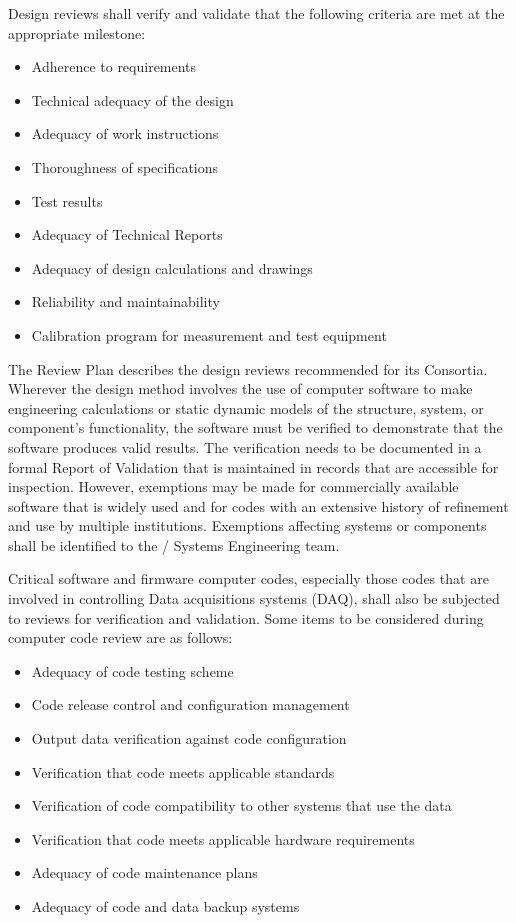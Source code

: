 Design reviews shall verify and validate that the following criteria
are met at the appropriate milestone:
\begin{itemize}
 \item Adherence to requirements
 \item Technical adequacy of the design
 \item Adequacy of work instructions
 \item Thoroughness of specifications
 \item Test results
 \item Adequacy of Technical Reports
 \item Adequacy of design calculations and drawings
 \item Reliability and maintainability
 \item Calibration program for measurement and test equipment
\end{itemize}

The  Review Plan describes the design reviews recommended for its
Consortia.  Wherever the design method involves the use of computer
software to make engineering calculations or static dynamic models of
the structure, system, or component's functionality, the software must
be verified to demonstrate that the software produces valid
results. The verification needs to be documented in a formal Report of
Validation that is maintained in records that are accessible for
inspection. However, exemptions may be made for commercially available
software that is widely used and for codes with an extensive history
of refinement and use by multiple institutions. Exemptions affecting
systems or components shall be identified to the / Systems
Engineering team.

Critical software and firmware computer codes, especially those codes
that are involved in controlling  Data acquisitions systems (DAQ),
shall also be subjected to reviews for verification and
validation. Some items to be considered during computer code review
are as follows:
\begin{itemize}
 \item Adequacy of code testing scheme
 \item Code release control and configuration management
 \item Output data verification against code configuration
 \item Verification that code meets applicable standards
 \item Verification of code compatibility to other systems that use the data
 \item Verification that code meets applicable hardware requirements
 \item Adequacy of code maintenance plans
 \item Adequacy of code and data backup systems
\end{itemize}

